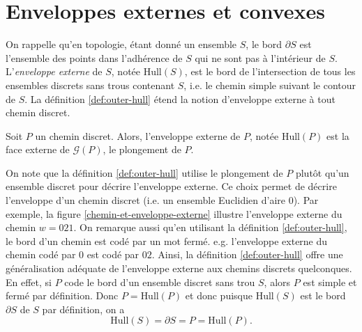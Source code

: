 \section{Enveloppes externes et convexes}

\newcommand{\hull}[1]{\text{Hull}(#1)}

On rappelle qu'en topologie, étant donné un ensemble $S$, le bord $\partial S$ est l'ensemble des points dans l'adhérence de $S$ qui ne sont pas à l'intérieur de $S$. L'\emph{enveloppe externe} de $S$, notée $\hull{S}$, est le bord de l'intersection de tous les ensembles discrets sans trous contenant $S$, i.e. le chemin simple suivant le contour de $S$. La définition \ref{def:outer-hull} étend la notion d'enveloppe externe à tout chemin discret.

\begin{definition}\label{def:outer-hull}
Soit $P$ un chemin discret. Alors, l'enveloppe externe de $P$, notée $\hull{P}$ est la face externe de $\mathcal{G}(P)$, le plongement de $P$.
\end{definition}

On note que la définition \ref{def:outer-hull} utilise le plongement de $P$ plutôt qu'un ensemble discret pour décrire l'enveloppe externe. Ce choix permet de décrire l'enveloppe d'un chemin discret (i.e. un ensemble Euclidien d'aire $0$). Par exemple, la figure \ref{chemin-et-enveloppe-externe} illustre l'enveloppe externe du chemin $w=021$.  On remarque aussi qu'en utilisant la définition \ref{def:outer-hull}, le bord d'un chemin est codé par un mot fermé. e.g. l'enveloppe externe du chemin codé par $0$ est codé par $02$. Ainsi, la définition \ref{def:outer-hull} offre une généralisation adéquate de l'enveloppe externe aux chemins discrets quelconques. En effet, si $P$ code le bord d'un ensemble discret sans trou $S$, alors $P$ est simple et fermé par définition. Donc $P=\hull{P}$ et donc puisque $\hull{S}$ est le bord $\partial S$ de $S$ par définition, on a
\begin{equation}
\hull{S} = \partial S = P = \hull{P}\text{.}
\end{equation}

